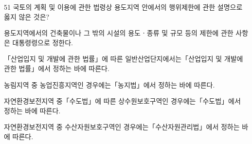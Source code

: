 \begin{question}{51}
국토의 계획 및 이용에 관한 법령상 용도지역 안에서의 행위제한에 관한 설명으로 옳지 않은 것은?
\begin{choices}
  \item 용도지역에서의 건축물이나 그 밖의 시설의 용도ㆍ종류 및 규모 등의 제한에 관한 사항은 대통령령으로 정한다.
  \item 「산업입지 및 개발에 관한 법률」에 따른 일반산업단지에서는「산업입지 및 개발에 관한 법률」에서 정하는 바에 따른다.
  \item 농림지역 중 농업진흥지역인 경우에는「농지법」에서 정하는 바에 따른다.
  \item 자연환경보전지역 중「수도법」에 따른 상수원보호구역인 경우에는「수도법」에서 정하는 바에 따른다.
  \item 자연환경보전지역 중 수산자원보호구역인 경우에는「수산자원관리법」에서 정하는 바에 따른다.
\end{choices}
\end{question}
